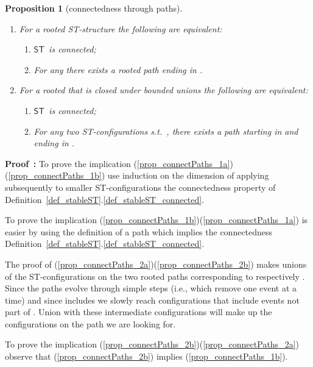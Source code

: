 \documentclass[submission,copyright,creativecommons]{eptcs}
\newtheorem{proposition}[theorem]{Proposition}
\newtheorem{definition}[theorem]{Definition}
\newenvironment{proof}[1][\!\!\,]{\vspace{1ex}\noindent\textbf{Proof #1: }}{\hfill\vspace{2ex}}
\newcommand{\cp}[1]{}
\newcommand\ST{\ensuremath{\mathsf{ST}}}
\begin{document}
\cp{
We can define for ST-structures the notion of \textit{ST-trace equivalence} \cite{GlabbeekV97splitting} and \textit{ST-bisimulation} \cite{Glabbeek06HDA} and investigate if these are preserved by action refinement (not done in this paper though).

\begin{definition}[ST-trace equivalence]\label{def_ST_equiv}
Two ST-structures are ST-trace equivalent iff\ \ they have the same set of ST-traces.
\end{definition}
}

\begin{proposition}[connectedness through paths]\label{prop_connectPaths}\ 
\begin{enumerate}
\item\label{prop_connectPaths_1} For a rooted ST-structure  the following are equivalent:
\begin{enumerate}
\item\label{prop_connectPaths_1a} \ST\ is connected;
\item\label{prop_connectPaths_1b} For any  there exists a rooted path ending in .
\end{enumerate}
\item\label{prop_connectPaths_2} For a rooted  that is closed under bounded unions the following are equivalent:
\begin{enumerate}
\item\label{prop_connectPaths_2a} \ST\ is connected;
\item\label{prop_connectPaths_2b} For any two ST-configurations s.t.\ , there exists a path starting in  and ending in .
\end{enumerate}
\end{enumerate}
\end{proposition}

\begin{proof}
To prove the implication (\ref{prop_connectPaths_1a})(\ref{prop_connectPaths_1b}) use induction on the dimension of  applying subsequently to smaller ST-configurations the connectedness property of Definition~\ref{def_stableST}.\ref{def_stableST_connected}.

To prove the implication (\ref{prop_connectPaths_1b})(\ref{prop_connectPaths_1a}) is easier by using the definition of a path which implies the connectedness Definition~\ref{def_stableST}.\ref{def_stableST_connected}.

The proof of (\ref{prop_connectPaths_2a})(\ref{prop_connectPaths_2b}) makes unions of the ST-configurations on the two rooted paths corresponding to  respectively . Since the paths evolve through simple steps (i.e., which remove one event at a time) and since  includes  we slowly reach configurations that include events not part of . Union with these intermediate configurations will make up the configurations on the path we are looking for.

To prove the implication (\ref{prop_connectPaths_2b})(\ref{prop_connectPaths_2a}) observe that (\ref{prop_connectPaths_2b}) implies (\ref{prop_connectPaths_1b}).
\end{proof}
\end{document}
